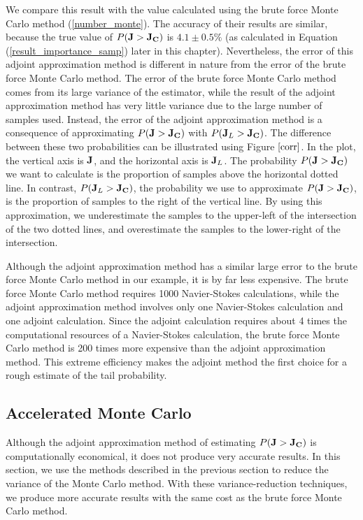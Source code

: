 We compare this result with the value calculated using the brute force
Monte Carlo method (\ref{number_monte}).
The accuracy of their results are similar, because the true value of
$P({\bf J} > {\bf J_C})$ is $4.1 \pm 0.5 \%$ (as calculated in Equation
(\ref{result_importance_samp}) later in this chapter).
Nevertheless, the error of this adjoint
approximation method is different in nature from the error of the brute force
Monte Carlo method.  The error of the brute force Monte Carlo method comes from
its
large variance of the estimator, while the result of the adjoint approximation
method has very little variance due to the large number of samples used.
Instead, the error of the adjoint approximation method is a consequence of
approximating $P({\bf J} > {\bf J_C})$ with $P({\bf J}_L > {\bf J_C})$.
The difference between these two probabilities can be illustrated using
Figure $\ref{corr}$.  In the plot, the vertical axis is $\bf J$, and the
horizontal axis is ${\bf J}_L$.  The probability $P({\bf J} > {\bf J_C})$
we want to calculate is the proportion of samples above the
horizontal dotted line.  In contrast, $P({\bf J}_L > {\bf J_C})$, the
probability we use to approximate $P({\bf J} > {\bf J_C})$, is the proportion
of samples to the right of the vertical line.  By using this
approximation, we underestimate the samples to the upper-left of the
intersection of the two dotted lines, and overestimate the samples to
the lower-right of the intersection.

Although the adjoint approximation method has a similar large error to the
brute force Monte Carlo method in our example, it is by far less expensive.
The brute force Monte Carlo method requires 1000 Navier-Stokes calculations,
while the adjoint approximation method involves only one Navier-Stokes
calculation and one adjoint calculation.
Since the adjoint calculation requires about 4 times
the computational resources of a Navier-Stokes calculation, the brute force
Monte Carlo method is 200 times more expensive than the adjoint approximation
method.  This extreme efficiency makes the adjoint method the first choice for
a rough estimate of the tail probability.


\subsection{Accelerated Monte Carlo}

Although the adjoint approximation method of estimating
$P({\bf J} > {\bf J_C})$ is computationally economical, it does not produce
very accurate results.  In this section, we use the methods described in
the previous section to reduce the variance of the Monte Carlo method.
With these
variance-reduction techniques, we produce more accurate results with the
same cost as the brute force Monte Carlo method.


